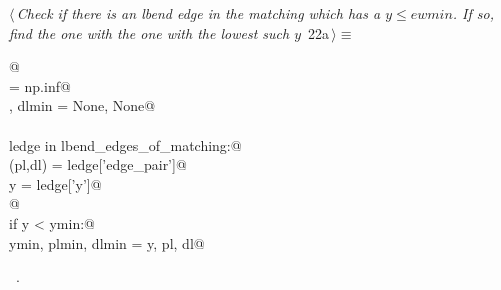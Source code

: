 \documentclass[10pt, english, oneside]{report}
\begin{document}
\begin{flushleft} \small
\begin{minipage}{\linewidth}\label{scrap24}\raggedright\small
{} $\langle\,${\itshape Check if there is an lbend edge in the matching which has a $y\leq ewmin$. If so, find the one with the one with the lowest such $y$}\nobreak\ {\footnotesize {22a}}$\,\rangle\equiv$
\vspace{-1ex}
\begin{list}{}{} \item
\mbox{}\verb@   @\\
\mbox{}\verb@ymin         = np.inf@\\
\mbox{}\verb@plmin, dlmin = None, None@\\
\mbox{}\verb@@\\
\mbox{}\verb@for ledge in lbend_edges_of_matching:@\\
\mbox{}\verb@    (pl,dl) = ledge['edge_pair']@\\
\mbox{}\verb@    y       = ledge['y']@\\
\mbox{}\verb@    @\\
\mbox{}\verb@    if y < ymin:@\\
\mbox{}\verb@        ymin, plmin, dlmin = y, pl, dl@\\
\mbox{}\verb@@{\NWsep}
\end{list}
\vspace{-1.5ex}
\footnotesize
\begin{list}{}{\setlength{\itemsep}{-\parsep}\setlength{\itemindent}{-\leftmargin}}
\item \NWtxtMacroRefIn\ .

\item{}
\end{list}
\end{minipage}\vspace{4ex}
\end{flushleft}
\end{document}
